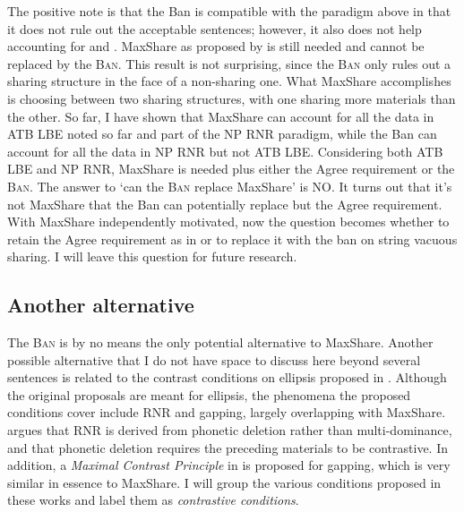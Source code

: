 \documentclass[output=paper]{langscibook}
\begin{document}
\ea
	\label{shenex34}
	\z 
\z 
The positive note is that the Ban is compatible with the paradigm above in that it does not rule out the acceptable sentences; however, it also does not help accounting for  and . MaxShare as proposed by \citet{Citko:2006} is still needed and cannot be replaced by the \textsc{Ban}. This result is not surprising, since the \textsc{Ban} only rules out a sharing structure in the face of a non-sharing one. What MaxShare accomplishes is choosing between two sharing structures, with one sharing more materials than the other. So far, I have shown that MaxShare can account for all the data in ATB LBE noted so far and part of the NP RNR paradigm, while the Ban can account for all the data in NP RNR but not ATB LBE. Considering both ATB LBE and NP RNR, MaxShare is needed plus either the Agree requirement or the \textsc{Ban}. The answer to `can the \textsc{Ban} replace MaxShare' is NO. It turns out that it's not MaxShare that the Ban can potentially replace but the Agree requirement. With MaxShare independently motivated, now the question becomes whether to retain the Agree requirement as in \citet{Shen:2018a} or to replace it with the ban on string vacuous sharing. I will leave this question for future research.

\subsection{Another alternative} 

The \textsc{Ban} is by no means the only potential alternative to MaxShare. Another possible alternative that I do not have space to discuss here beyond several sentences is related to the contrast conditions on ellipsis proposed in \citet{Hartmann:2000, Hartmann:2003, Fery:2005a}. Although the original proposals are meant for ellipsis, the phenomena the proposed conditions cover include RNR and gapping, largely overlapping with MaxShare. \citet{Hartmann:2000, Hartmann:2003} argues that RNR is derived from phonetic deletion rather than multi-dominance, and that phonetic deletion requires the preceding materials to be contrastive. In addition, a \textit{Maximal Contrast Principle} in  is proposed for gapping, which is very similar in essence to MaxShare. I will group the various conditions proposed in these works and label them as \textit{contrastive conditions}.
\end{document}
